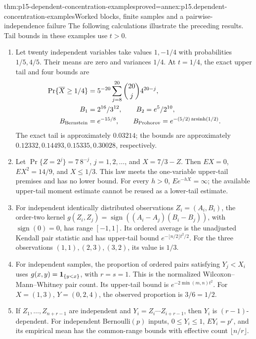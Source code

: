 \begin{hbtheorem}{thm:p15-dependent-concentration-examples}{proved=annex:p15.dependent-concentration-examples}{Worked blocks, finite samples and a pairwise-independence failure}
The following calculations illustrate the preceding results. Tail bounds
in these examples use \(t>0\).
\begin{enumerate}
\item Let twenty independent variables take values \(1,-1/4\) with
probabilities \(1/5,4/5\). Their means are zero and variances \(1/4\).
At \(t=1/4\), the exact upper tail and four bounds are
\[
\begin{split}
 \Pr\{\overline X\geq1/4\}
 &=5^{-20}\sum_{j=8}^{20}\binom{20}{j}4^{20-j},\\
 B_1&=2^{16}/3^{12},\qquad B_2=e^5/2^{10},\\
 B_{\rm Bernstein}&=e^{-15/8},\qquad
 B_{\rm Prohorov}=e^{-(5/2)\operatorname{arsinh}(1/2)} .
\end{split}
\]
The exact tail is approximately \(0.03214\); the bounds are approximately
\(0.12332,0.14493,0.15335,0.30028\), respectively.
\item Let \(\Pr\{Z=2^j\}=7\,8^{-j}\), \(j=1,2,\ldots\), and
\(X=7/3-Z\). Then \(EX=0\), \(EX^2=14/9\), and \(X\leq1/3\).
This law meets the one-variable upper-tail premises and has no lower
bound. For every \(h>0\), \(Ee^{-hX}=\infty\); the available upper-tail
moment estimate cannot be reused as a lower-tail estimate.
\item For independent identically distributed observations
\(Z_i=(A_i,B_i)\), the order-two kernel
\(g(Z_i,Z_j)=\operatorname{sign}((A_i-A_j)(B_i-B_j))\), with
\(\operatorname{sign}(0)=0\), has range \([-1,1]\).
Its ordered average is the unadjusted Kendall pair statistic and has upper-tail bound
\(e^{-\lfloor n/2\rfloor t^2/2}\). For the three observations
\((1,1),(2,3),(3,2)\), its value is \(1/3\).
\item For independent samples, the proportion of ordered pairs satisfying
\(Y_j<X_i\) uses \(g(x,y)={\bf1}_{\{y<x\}}\), with \(r=s=1\).
This is the normalized Wilcoxon--Mann--Whitney pair count.
Its upper-tail bound is \(e^{-2\min(m,n)t^2}\).
For \(X=(1,3)\), \(Y=(0,2,4)\), the observed proportion is \(3/6=1/2\).
\item If \(Z_1,\ldots,Z_{n+r-1}\) are independent and
\(Y_i=Z_i\cdots Z_{i+r-1}\), then \(Y_i\) is \((r-1)\)-dependent.
For independent Bernoulli\((p)\) inputs, \(0\leq Y_i\leq1\),
\(EY_i=p^r\), and its empirical mean has the common-range bounds with
effective count \(\lfloor n/r\rfloor\).

\end{enumerate}
\end{hbtheorem}
